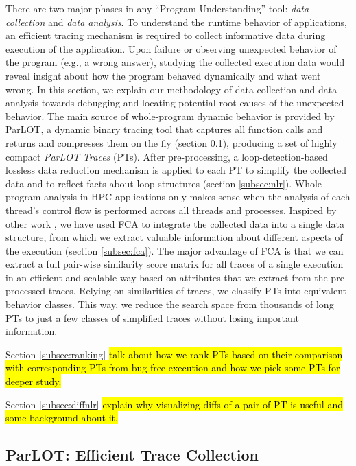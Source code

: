 There are two major phases in any ``Program Understanding'' tool: \textit{data collection} and \textit{data analysis}.
%
To understand the runtime behavior of applications, an efficient tracing mechanism is required to collect informative data during execution of the application.
%
Upon failure or observing unexpected behavior of the program (e.g., a wrong answer), studying the collected execution data would reveal insight about how the program behaved dynamically and what went wrong.
%
In this section, we explain our methodology of data collection and data analysis towards debugging and locating potential root causes of the unexpected behavior.
%
The main source of whole-program dynamic behavior is provided by ParLOT, a dynamic binary tracing tool that captures all function calls and returns and compresses them on the fly (section \ref{subsec:parlot}), producing a set of highly compact \textit{ParLOT Traces} (PTs).
%
After pre-processing, a loop-detection-based lossless data reduction mechanism is applied to each PT to simplify the collected data and to reflect facts about loop structures (section \ref{subsec:nlr}).
%
Whole-program analysis in HPC applications only makes sense when the analysis of each thread's control flow is performed across all threads and processes.
%
Inspired by other work \cite{weberStructural} \cite{Alqadah2011} \cite{Ignatov17} \cite{latticeForDistConst}, we have used FCA \cite{clbook} to integrate the collected data into a single data structure, from which we extract valuable information about different aspects of the execution (section \ref{subsec:fca}).
%
The major advantage of FCA is that we can extract a full pair-wise similarity score matrix for all traces of a single execution in an efficient and scalable way based on attributes that we extract from the pre-processed traces.
%
Relying on similarities of traces, we classify PTs into equivalent-behavior classes.
%
This way, we reduce the search space from thousands of long PTs to just a few classes of simplified traces without losing important information.

Section \ref{subsec:ranking} \hl{ talk about how we rank PTs based on their comparison with corresponding PTs from bug-free execution and how we pick some PTs for deeper study.}

Section \ref{subsec:diffnlr}\hl{ explain why visualizing diffs of a pair of PT is useful and some background about it.}


\subsection{ParLOT: Efficient Trace Collection}
\label{subsec:parlot}

